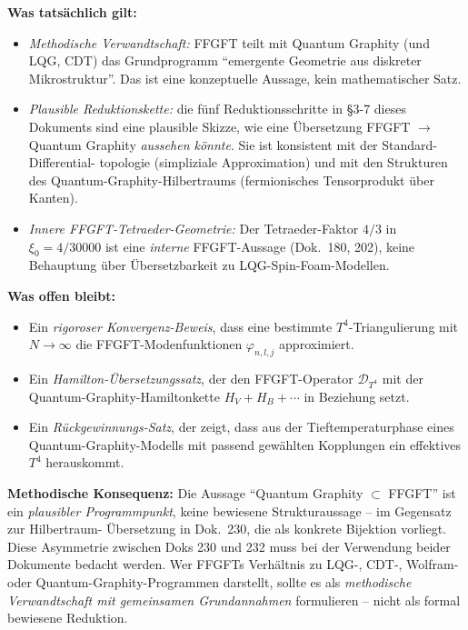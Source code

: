\textbf{Was tatsächlich gilt:}
\begin{itemize}[leftmargin=2em,itemsep=2pt,topsep=2pt]
  \item \emph{Methodische Verwandtschaft:} FFGFT teilt mit Quantum
        Graphity (und LQG, CDT) das Grundprogramm \enquote{emergente
        Geometrie aus diskreter Mikrostruktur}. Das ist eine
        konzeptuelle Aussage, kein mathematischer Satz.
  \item \emph{Plausible Reduktionskette:} die fünf Reduktionsschritte
        in §3-7 dieses Dokuments sind eine plausible Skizze, wie eine
        Übersetzung FFGFT $\to$ Quantum Graphity \emph{aussehen
        könnte}. Sie ist konsistent mit der Standard-Differential-
        topologie (simpliziale Approximation) und mit den Strukturen
        des Quantum-Graphity-Hilbertraums (fermionisches Tensorprodukt
        über Kanten).
  \item \emph{Innere FFGFT-Tetraeder-Geometrie:} Der Tetraeder-Faktor
        $4/3$ in $\xi_0 = 4/30000$ ist eine \emph{interne}
        FFGFT-Aussage (Dok.~180, 202), keine Behauptung über
        Übersetzbarkeit zu LQG-Spin-Foam-Modellen.
\end{itemize}

\textbf{Was offen bleibt:}
\begin{itemize}[leftmargin=2em,itemsep=2pt,topsep=2pt]
  \item Ein \emph{rigoroser Konvergenz-Beweis}, dass eine bestimmte
        $T^4$-Triangulierung mit $N \to \infty$ die FFGFT-Modenfunktionen
        $\varphi_{n,l,j}$ approximiert.
  \item Ein \emph{Hamilton-Übersetzungssatz}, der den FFGFT-Operator
        $\mathcal{D}_{T^4}$ mit der Quantum-Graphity-Hamiltonkette
        $H_V + H_B + \cdots$ in Beziehung setzt.
  \item Ein \emph{Rückgewinnungs-Satz}, der zeigt, dass aus der
        Tieftemperaturphase eines Quantum-Graphity-Modells mit
        passend gewählten Kopplungen ein effektives $T^4$ herauskommt.
\end{itemize}

\textbf{Methodische Konsequenz:} Die Aussage \enquote{Quantum
Graphity $\subset$ FFGFT} ist ein \emph{plausibler Programmpunkt},
keine bewiesene Strukturaussage -- im Gegensatz zur Hilbertraum-
Übersetzung in Dok.~230, die als konkrete Bijektion vorliegt.
Diese Asymmetrie zwischen Doks 230 und 232 muss bei der Verwendung
beider Dokumente bedacht werden. Wer FFGFTs Verhältnis zu LQG-,
CDT-, Wolfram- oder Quantum-Graphity-Programmen darstellt, sollte
es als \emph{methodische Verwandtschaft mit gemeinsamen
Grundannahmen} formulieren -- nicht als formal bewiesene Reduktion.

